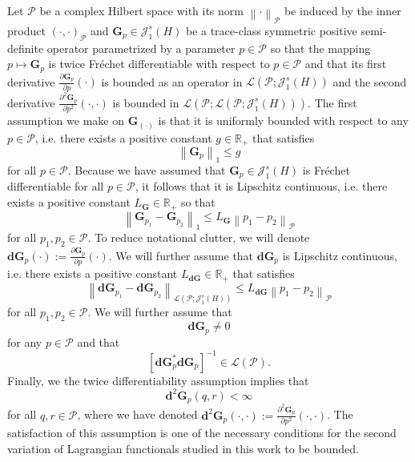 \documentclass{amsart}
\newcommand{\sL}{\mathscr L}
\newcommand{\sJ}{\mathscr J}
\newcommand{\p}[1]{\left( {#1} \right)}
\newcommand{\norm}[1]{\left\| #1 \right\|}
\newcommand{\br}[1]{\left[ #1 \right]}
\newcommand{\sP}{\mathcal{P}}
\newcommand{\bG}{\mathbf G}
\newcommand{\bd}{\mathbf d}
\begin{document}
Let $\sP$ be a complex Hilbert space with its norm $\norm{\cdot}_{\sP}$ be induced by the inner product $\p{\cdot, \cdot}_{\sP}$ and $\bG_p \in \sJ_1^s(H)$ be a trace-class symmetric positive semi-definite operator parametrized by a parameter $p \in \sP$ so that the mapping $p \mapsto \bG_p$ is twice Fr\'echet differentiable with respect to $p\in \sP$ and that its first derivative $\frac{\partial \bG_{p}}{\partial p}\p{\cdot}$ is bounded as an operator in $\sL\p{\sP; \sJ_1^s(H)}$  and the second derivative $\frac{\partial^2\bG_p}{\partial p^2}(\cdot,\cdot)$ is bounded in $\sL\p{\sP;\sL\p{\sP;\sJ_1^s(H)}}$. The first assumption we make on $\bG_{\p{\cdot}}$ is that it is uniformly bounded with respect to any $p\in\sP$, i.e. there exists a positive constant $g\in \mathbb R_+$ that satisfies
\begin{equation} \label{eqn: G bound}
    \norm{\bG_p}_1 \leq g
\end{equation}
for all $p \in \sP$. Because we have assumed that $\bG_p \in \sJ_1^s(H)$ is Fr\'echet differentiable for all $p \in \sP$, it follows that it is Lipschitz continuous, i.e. there exists a positive constant $L_\bG \in \mathbb R_+$ so that
\begin{equation} \label{eqn: G lipschitz bound}
    \norm{\bG_{p_1} - \bG_{p_2}}_{1} \leq L_{\bG} 
    \norm{p_1 - p_2}_{\sP}
\end{equation}
for all $p_1,p_2 \in \sP$. To reduce notational clutter, we will denote $\bd\bG_p\p{\cdot} := \frac{\partial \bG_{p}}{\partial p}(\cdot)$. We will further assume that $\bd\bG_p$ is Lipschitz continuous, i.e. there exists a positive constant $L_{\bd\bG} \in \mathbb R_+$ that satisfies 
\begin{equation} \label{eqn: dG lipshitz bound}
\norm{\bd\bG_{p_1} - \bd\bG_{p_2}}_{\sL\p{\sP; \sJ_1^s(H)}} \leq L_{\bd\bG} \norm{p_1 - p_2}_{\sP}
\end{equation}
for all $p_1,p_2 \in \sP$. We will further assume that 
\begin{equation} \label{eqn: nonzero assumption}
    \bd\bG_p \neq 0
\end{equation}
for any $p\in \sP$ and that 
\begin{equation} \label{eqn: invertability assumption}
    \br{\bd\bG_p^*\bd\bG_p}^{-1} \in \sL\p{\sP}.
\end{equation}
Finally, we the twice differentiability assumption implies that
\begin{equation} \label{eqn: bounded second variation}
    \bd^2\bG_p(q,r) < \infty
\end{equation}
for all $q,r \in \sP$, where we have denoted $\bd^2\bG_p(\cdot,\cdot):=\frac{\partial^2 \bG_p}{\partial p^2}(\cdot,\cdot)$. The satisfaction of this assumption is one of the necessary conditions for the second variation of Lagrangian functionals studied in this work to be bounded.  
\end{document}
